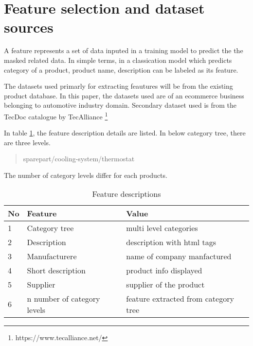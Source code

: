 \section {Feature selection and dataset sources}

A feature represents a set of data inputed in a training model to predict the the masked related data. In simple terms, in a classication model which predicts category of a product, product name, description can be labeled as its feature. 

The datasets used primarly for extracting feautures will be from the existing product database. In this paper, the datasets used are of an ecommerce business belonging to automotive industry domain. Secondary dataset used is from the TecDoc catalogue by TecAlliance \footnote{https://www.tecalliance.net/}

In table \ref{table:features}, the feature description details are listed. In below category tree, there are three levels.

\begin{quote} 
\centering 
sparepart/cooling-system/thermostat
\end{quote}

The number of category levels differ for each products. 

\begin{table}[h!]
\begin{center}
      \caption{Feature descriptions}
      \begin{tabular}{ p{0.3cm}p{3cm}p{6cm}  }
            \toprule
            
            \textbf{No}& \textbf{Feature} & \textbf{Value}\\
            \midrule
            1&Category tree & multi level categories\\
            2&Description & description with html tags\\
            3&Manufacturere & name of company manfactured\\
            4&Short description  & product info displayed\\
            5&Supplier  &  supplier of the product\\
            6&n number of \newline  category levels   &  feature extracted from category tree\\
           
            \hline
            \end{tabular}
\end{center}

\label{table:features}
\end{table}


